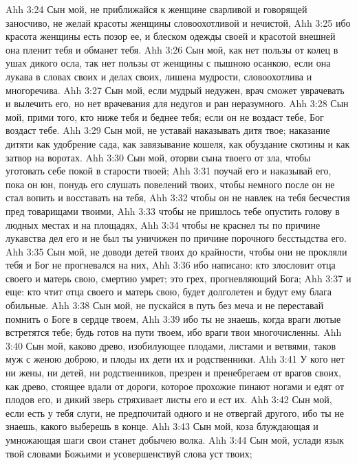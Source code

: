 \vs Ahh 3:24
Сын мой, не приближайся к женщине сварливой и говорящей заносчиво, не желай красоты женщины словоохотливой и нечистой,
\vs Ahh 3:25
ибо красота женщины есть позор ее, и блеском одежды своей и красотой внешней она пленит тебя и обманет тебя.
\vs Ahh 3:26
Сын мой, как нет пользы от колец в ушах дикого осла, так нет пользы от женщины с пышною осанкою, если она лукава в словах своих и делах своих, лишена мудрости, словоохотлива и многоречива.
\vs Ahh 3:27
Сын мой, если мудрый недужен, врач сможет уврачевать и вылечить его, но нет врачевания для недугов и ран неразумного.
\vs Ahh 3:28
Сын мой, прими того, кто ниже тебя и беднее тебя; если он не воздаст тебе, Бог воздаст тебе.
\vs Ahh 3:29
Сын мой, не уставай наказывать дитя твое; наказание дитяти как удобрение сада, как завязывание кошеля, как обуздание скотины и как затвор на воротах.
\vs Ahh 3:30
Сын мой, оторви сына твоего от зла, чтобы уготовать себе покой в старости твоей;
\vs Ahh 3:31
поучай его и наказывай его, пока он юн, понудь его слушать повелений твоих, чтобы немного после он не стал вопить и восставать на тебя,
\vs Ahh 3:32
чтобы он не навлек на тебя бесчестия пред товарищами твоими,
\vs Ahh 3:33
чтобы не пришлось тебе опустить голову в людных местах и на площадях,
\vs Ahh 3:34
чтобы не краснел ты по причине лукавства дел его и не был ты уничижен по причине порочного бесстыдства его.
\vs Ahh 3:35
Сын мой, не доводи детей твоих до крайности, чтобы они не прокляли тебя и Бог не прогневался на них,
\vs Ahh 3:36
ибо написано: кто злословит отца своего и матерь свою, смертию умрет; это грех, прогневляющий Бога;
\vs Ahh 3:37
и еще: кто чтит отца своего и матерь свою, будет долголетен и будут ему блага обильные.
\vs Ahh 3:38
Сын мой, не пускайся в путь без меча и не переставай помнить о Боге в сердце твоем,
\vs Ahh 3:39
ибо ты не знаешь, когда враги лютые встретятся тебе; будь готов на пути твоем, ибо враги твои многочисленны.
\vs Ahh 3:40
Сын мой, каково древо, изобилующее плодами, листами и ветвями, таков муж с женою доброю, и плоды их дети их и родственники.
\vs Ahh 3:41
У кого нет ни жены, ни детей, ни родственников, презрен и пренебрегаем от врагов своих, как древо, стоящее вдали от дороги, которое прохожие пинают ногами и едят от плодов его, и дикий зверь стряхивает листы его и ест их.
\vs Ahh 3:42
Сын мой, если есть у тебя слуги, не предпочитай одного и не отвергай другого, ибо ты не знаешь, какого выберешь в конце.
\vs Ahh 3:43
Сын мой, коза блуждающая и умножающая шаги свои станет добычею волка.
\vs Ahh 3:44
Сын мой, услади язык твой словами Божьими и усовершенствуй слова уст твоих;

